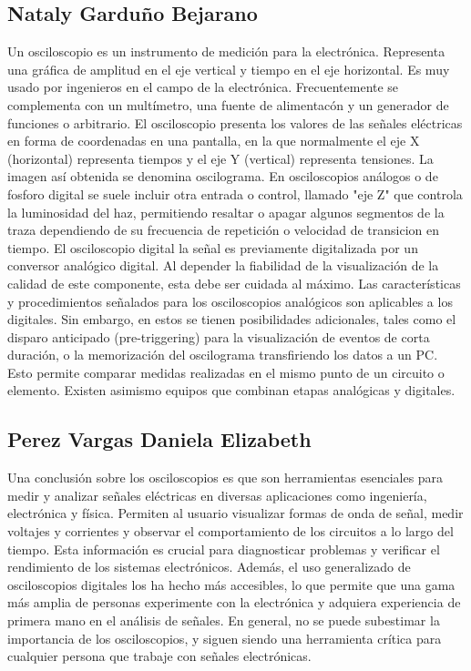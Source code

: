 \documentclass[10pt]{article}
\begin{document}
\begin{multicols}{2}
\subsection{Nataly Garduño Bejarano}
Un osciloscopio es un instrumento de medición para la electrónica. Representa una gráfica de amplitud en el eje vertical y tiempo en el eje horizontal. Es muy usado por ingenieros en el campo de la electrónica. Frecuentemente se complementa con un multímetro, una fuente de alimentacón y un generador de funciones o arbitrario.
El osciloscopio presenta los valores de las señales eléctricas en forma de coordenadas en una pantalla, en la que normalmente el eje X (horizontal) representa tiempos y el eje Y (vertical) representa tensiones. La imagen así obtenida se denomina oscilograma. En osciloscopios análogos o de fosforo digital se suele incluir otra entrada o control, llamado "eje Z" que controla la luminosidad del haz, permitiendo resaltar o apagar algunos segmentos de la traza dependiendo de su frecuencia de repetición o velocidad de transicion en tiempo.
El osciloscopio digital la señal es previamente digitalizada por un conversor analógico digital. Al depender la fiabilidad de la visualización de la calidad de este componente, esta debe ser cuidada al máximo.
Las características y procedimientos señalados para los osciloscopios analógicos son aplicables a los digitales. Sin embargo, en estos se tienen posibilidades adicionales, tales como el disparo anticipado (pre-triggering) para la visualización de eventos de corta duración, o la memorización del oscilograma transfiriendo los datos a un PC. Esto permite comparar medidas realizadas en el mismo punto de un circuito o elemento. Existen asimismo equipos que combinan etapas analógicas y digitales.

\subsection{Perez Vargas Daniela Elizabeth}
Una conclusión sobre los osciloscopios es que son herramientas esenciales para medir y analizar señales eléctricas en diversas aplicaciones como ingeniería, electrónica y física. Permiten al usuario visualizar formas de onda de señal, medir voltajes y corrientes y observar el comportamiento de los circuitos a lo largo del tiempo. Esta información es crucial para diagnosticar problemas y verificar el rendimiento de los sistemas electrónicos. Además, el uso generalizado de osciloscopios digitales los ha hecho más accesibles, lo que permite que una gama más amplia de personas experimente con la electrónica y adquiera experiencia de primera mano en el análisis de señales. En general, no se puede subestimar la importancia de los osciloscopios, y siguen siendo una herramienta crítica para cualquier persona que trabaje con señales electrónicas.

\end{multicols}
\end{document}

